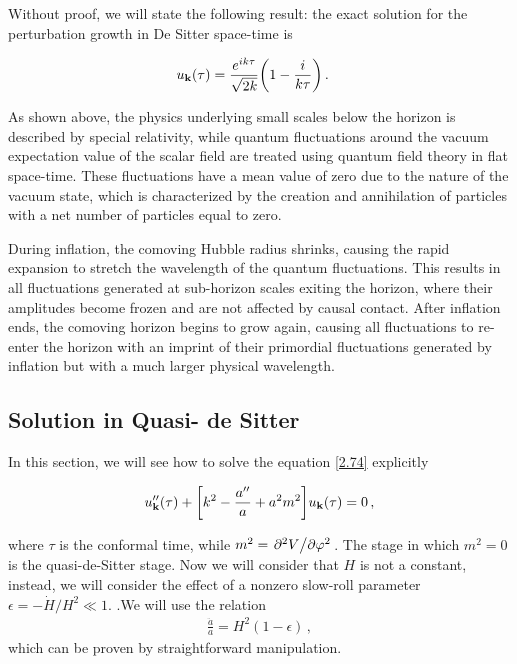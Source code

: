  Without proof, we will state the following result: the exact solution for the perturbation growth in De Sitter space-time is 

\begin{align}
     u_{\mathbf{k}}(\tau ) &= \frac{e^{ik \tau }}{\sqrt{2 k}} \qty(1 - \frac{i}{k \tau })
    \,.
\end{align}

As shown above, the physics underlying small scales below the horizon is described by special relativity, while quantum fluctuations around the vacuum expectation value of the scalar field are treated using quantum field theory in flat space-time. These fluctuations have a mean value of zero due to the nature of the vacuum state, which is characterized by the creation and annihilation of particles with a net number of particles equal to zero.

During inflation, the comoving Hubble radius shrinks, causing the rapid expansion to stretch the wavelength of the quantum fluctuations. This results in all fluctuations generated at sub-horizon scales exiting the horizon, where their amplitudes become frozen and are not affected by causal contact. After inflation ends, the comoving horizon begins to grow again, causing all fluctuations to re-enter the horizon with an imprint of their primordial fluctuations generated by inflation but with a much larger physical wavelength.

\subsection*{Solution in Quasi- de Sitter}
In this section, we will see how to solve the equation \ref{2.74} explicitly 

\begin{align}
    u''_{\mathbf{k}} (\tau )
    + 
    \qty[k^2 - \frac{a''}{a} + a^2 m^2]  u_{\mathbf{k}}(\tau ) = 0\label{2.88}
    \,,
\end{align}

where \(\tau \) is the conformal time, while \(m^2 = \pdv*[2]{V}{\varphi }\). 
The stage in which \(m^2 = 0\) is the quasi-de-Sitter stage. 
Now we will consider that \(H\) is not a constant, instead, we will consider the effect of a nonzero slow-roll parameter \(\epsilon = - \dot{H} / H^2 \ll 1\). 
.We will use the relation
\begin{align}
    \frac{\ddot{a}}{a} = H^2 ( 1- \epsilon ) \label{2.89}
    \,,
\end{align}
which can be proven by straightforward manipulation.\\

